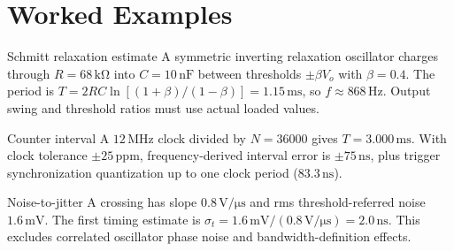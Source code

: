 \documentclass[10pt,letterpaper]{article}
\begin{document}
\section{Worked Examples}
\begin{CornellExamBox}{Schmitt relaxation estimate}
A symmetric inverting relaxation oscillator charges through $R=68\,\mathrm{k\Omega}$ into $C=10\,\mathrm{nF}$ between thresholds $\pm\beta V_o$ with $\beta=0.4$. The period is $T=2RC\ln[(1+\beta)/(1-\beta)]=1.15\,\mathrm{ms}$, so $f\approx868\,\mathrm{Hz}$. Output swing and threshold ratios must use actual loaded values.
\end{CornellExamBox}
\begin{CornellExamBox}{Counter interval}
A $12\,\mathrm{MHz}$ clock divided by $N=36000$ gives $T=3.000\,\mathrm{ms}$. With clock tolerance $\pm25\,\mathrm{ppm}$, frequency-derived interval error is $\pm75\,\mathrm{ns}$, plus trigger synchronization quantization up to one clock period ($83.3\,\mathrm{ns}$).
\end{CornellExamBox}
\begin{CornellExamBox}{Noise-to-jitter}
A crossing has slope $0.8\,\mathrm{V/\mu s}$ and rms threshold-referred noise $1.6\,\mathrm{mV}$. The first timing estimate is $\sigma_t=1.6\,\mathrm{mV}/(0.8\,\mathrm{V/\mu s})=2.0\,\mathrm{ns}$. This excludes correlated oscillator phase noise and bandwidth-definition effects.
\end{CornellExamBox}
\end{document}
